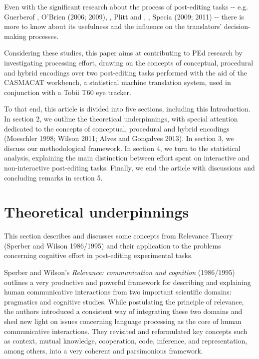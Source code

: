 \documentclass[output=paper]{langsci/langscibook}
\begin{document}
Even with the significant research about the process of post-editing tasks -{}- e.g. Guerberof \citet{Arenas2012}, O’Brien (2006; 2009), \citet{Depraetere2010}, Plitt and \citet{Masselot2010}, \citet{SousaEtAl2011}, Specia (2009; 2011) -{}- there is more to know about its usefulness and the influence on the translators’ decision-making processes. 



Considering these studies, this paper aims at contributing to PEd research by investigating processing effort, drawing on the concepts of conceptual, procedural and hybrid encodings over two post-editing tasks performed with the aid of the CASMACAT workbench, a statistical machine translation system, used in conjunction with a Tobii T60 eye tracker.



To that end, this article is divided into five sections, including this Introduction. In section 2, we outline the theoretical underpinnings, with special attention dedicated to the concepts of conceptual, procedural and hybrid encodings (Moeschler 1998; Wilson 2011; Alves and Gonçalves 2013). In section 3, we discuss our methodological framework. In section 4, we turn to the statistical analysis, explaining the main distinction between effort spent on interactive and non-interactive post-editing tasks. Finally, we end the article with discussions and concluding remarks in section 5.


\section{Theoretical underpinnings}

This section describes and discusses some concepts from Relevance Theory (Sperber and Wilson 1986/1995) and their application to the problems concerning cognitive effort in post-editing experimental tasks. 


Sperber and Wilson’s \textit{Relevance: communication and cognition} (1986/1995) outlines a very productive and powerful framework for describing and explaining human communicative interactions from two important scientific domains: pragmatics and cognitive studies. While postulating the principle of relevance, the authors introduced a consistent way of integrating these two domains and shed new light on issues concerning language processing as the core of human communicative interactions. They revisited and reformulated key concepts such as context, mutual knowledge, cooperation, code, inference, and representation, among others, into a very coherent and parsimonious framework.
\end{document}
